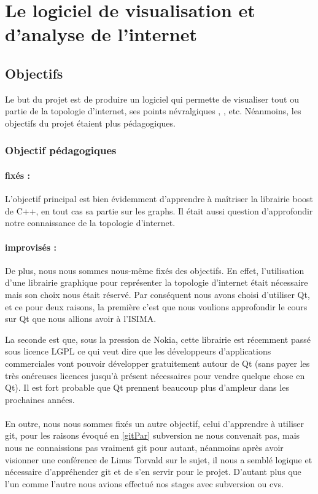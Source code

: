 \section{Le logiciel de visualisation et d'analyse de l'internet}
\subsection{Objectifs}

Le but du projet est de produire un logiciel qui permette de visualiser tout ou partie de la topologie d'internet, ses points névralgiques %
, , etc. 
Néanmoins, les objectifs du projet étaient plus pédagogiques.

\subsubsection{Objectif pédagogiques}
\paragraph{fixés : } L'objectif principal est bien évidemment d'apprendre à maîtriser la librairie boost de C++, en tout cas sa partie sur les graphs. Il était aussi question d'approfondir notre connaissance de la topologie d'internet.
\paragraph{improvisés : } De plus, nous nous sommes nous-même fixés des objectifs. En effet, l'utilisation d'une librairie graphique pour représenter la topologie d'internet était nécessaire mais son choix nous était réservé. Par conséquent nous avons choisi d'utiliser Qt, et ce pour deux raisons, la première c'est que nous voulions approfondir le cours sur Qt que nous allions avoir à l'ISIMA. 

La seconde est que, sous la pression de Nokia, cette librairie est récemment passé sous licence LGPL ce qui veut dire que les développeurs d'applications commerciales vont pouvoir développer gratuitement autour de Qt (sans payer les très onéreuses licences jusqu'à présent nécessaires pour vendre quelque chose en Qt). Il est fort probable que Qt prennent beaucoup plus d'ampleur dans les prochaines années.

\paragraph{} En outre, nous nous sommes fixés un autre objectif, celui d'apprendre à utiliser git, pour les raisons évoqué en \ref{gitPar} subversion ne nous convenait pas, mais nous ne connaissions pas vraiment git pour autant, néanmoins après avoir visionner une conférence de Linus Torvald sur le sujet, il nous a semblé logique et nécessaire d'appréhender git et de s'en servir pour le projet. D'autant plus que l'un comme l'autre nous avions effectué nos stages avec subversion ou cvs.

